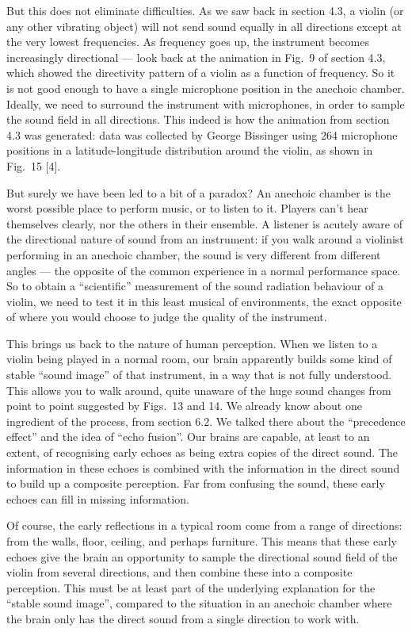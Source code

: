   But this does not eliminate difficulties. As we saw back in section 4.3, a 
  violin (or any other vibrating object) will not send sound equally in all 
  directions except at the very lowest frequencies. As frequency goes up, the 
  instrument becomes increasingly directional — look back at the animation in 
  Fig.\ 9 of section 4.3, which showed the directivity pattern of a violin as a 
  function of frequency. So it is not good enough to have a single microphone 
  position in the anechoic chamber. Ideally, we need to surround the instrument 
  with microphones, in order to sample the sound field in all directions. This 
  indeed is how the animation from section 4.3 was generated: data was 
  collected by George Bissinger using 264 microphone positions in a 
  latitude-longitude distribution around the violin, as shown in Fig.\ 15 [4]. 

  But surely we have been led to a bit of a paradox? An anechoic chamber is the 
  worst possible place to perform music, or to listen to it. Players can’t hear 
  themselves clearly, nor the others in their ensemble. A listener is acutely 
  aware of the directional nature of sound from an instrument: if you walk 
  around a violinist performing in an anechoic chamber, the sound is very 
  different from different angles — the opposite of the common experience in a 
  normal performance space. So to obtain a “scientific” measurement of the 
  sound radiation behaviour of a violin, we need to test it in this least 
  musical of environments, the exact opposite of where you would choose to 
  judge the quality of the instrument. 

  This brings us back to the nature of human perception. When we listen to a 
  violin being played in a normal room, our brain apparently builds some kind 
  of stable “sound image” of that instrument, in a way that is not fully 
  understood. This allows you to walk around, quite unaware of the huge sound 
  changes from point to point suggested by Figs.\ 13 and 14. We already know 
  about one ingredient of the process, from section 6.2. We talked there about 
  the “precedence effect” and the idea of “echo fusion”. Our brains are 
  capable, at least to an extent, of recognising early echoes as being extra 
  copies of the direct sound. The information in these echoes is combined with 
  the information in the direct sound to build up a composite perception. Far 
  from confusing the sound, these early echoes can fill in missing information. 

  Of course, the early reflections in a typical room come from a range of 
  directions: from the walls, floor, ceiling, and perhaps furniture. This means 
  that these early echoes give the brain an opportunity to sample the 
  directional sound field of the violin from several directions, and then 
  combine these into a composite perception. This must be at least part of the 
  underlying explanation for the “stable sound image”, compared to the 
  situation in an anechoic chamber where the brain only has the direct sound 
  from a single direction to work with. 

